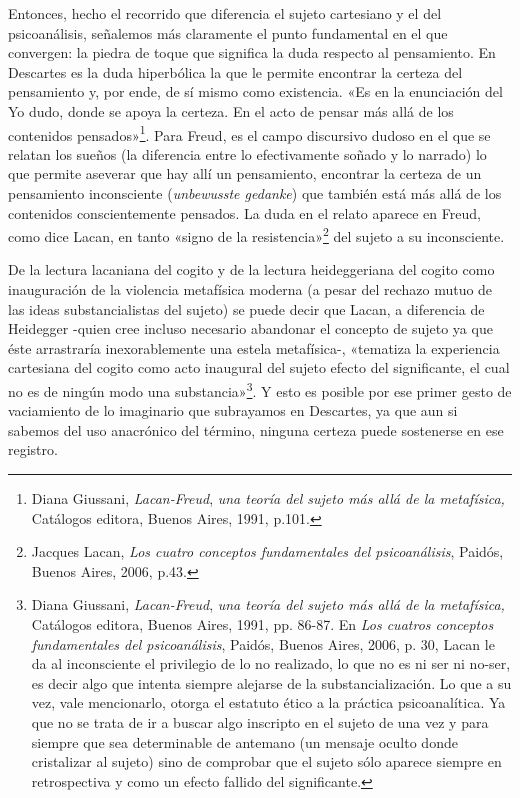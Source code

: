 Entonces, hecho el recorrido que diferencia el sujeto cartesiano y el del psicoanálisis, señalemos más claramente el punto fundamental en el que convergen: la piedra de toque que significa la duda respecto al pensamiento. En Descartes es la duda hiperbólica la que le permite encontrar la certeza del pensamiento y, por ende, de sí mismo como existencia. «Es en la enunciación del Yo dudo, donde se apoya la certeza. En el acto de pensar más allá de los contenidos pensados»\footnote{Diana Giussani, \emph{Lacan-Freud}, \emph{una teoría del sujeto más allá de la metafísica,} Catálogos editora, Buenos Aires, 1991, p.101.}. Para Freud, es el campo discursivo dudoso en el que se relatan los sueños (la diferencia entre lo efectivamente soñado y lo narrado) lo que permite aseverar que hay allí un pensamiento, encontrar la certeza de un pensamiento inconsciente (\emph{unbewusste gedanke}) que también está más allá de los contenidos conscientemente pensados. La duda en el relato aparece en Freud, como dice Lacan, en tanto «signo de la resistencia»\footnote{Jacques Lacan, \emph{Los cuatro conceptos fundamentales del psicoanálisis}, Paidós, Buenos Aires, 2006, p.43.} del sujeto a su inconsciente.

De la lectura lacaniana del cogito y de la lectura heideggeriana del cogito como inauguración de la violencia metafísica moderna (a pesar del rechazo mutuo de las ideas substancialistas del sujeto) se puede decir que Lacan, a diferencia de Heidegger -quien cree incluso necesario abandonar el concepto de sujeto ya que éste arrastraría inexorablemente una estela metafísica-, «tematiza la experiencia cartesiana del cogito como acto inaugural del sujeto efecto del significante, el cual no es de ningún modo una substancia»\footnote{Diana Giussani, \emph{Lacan-Freud}, \emph{una teoría del sujeto más allá de la metafísica,} Catálogos editora, Buenos Aires, 1991, pp. 86-87. En \emph{Los cuatros conceptos fundamentales del psicoanálisis}, Paidós, Buenos Aires, 2006, p. 30, Lacan le da al inconsciente el privilegio de lo no realizado, lo que no es ni ser ni no-ser, es decir algo que intenta siempre alejarse de la substancialización. Lo que a su vez, vale mencionarlo, otorga el estatuto ético a la práctica psicoanalítica. Ya que no se trata de ir a buscar algo inscripto en el sujeto de una vez y para siempre que sea determinable de antemano (un mensaje oculto donde cristalizar al sujeto) sino de comprobar que el sujeto sólo aparece siempre en retrospectiva y como un efecto fallido del significante.}. Y esto es posible por ese primer gesto de vaciamiento de lo imaginario que subrayamos en Descartes, ya que aun si sabemos del uso anacrónico del término, ninguna certeza puede sostenerse en ese registro.

